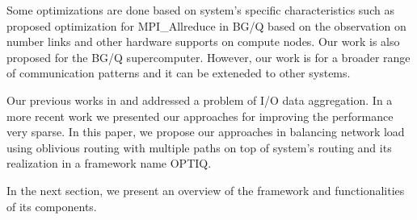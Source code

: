 
Some optimizations are done based on system’s specific characteristics such as \cite{Kumar:Allreduce} proposed optimization for MPI\_Allreduce in BG/Q based on the observation on number links and other hardware supports on compute nodes. Our work is also proposed for the BG/Q supercomputer. However, our work is for a broader range of communication patterns and it can be exteneded to other systems.

Our previous works in \cite{Vishwanath:GLEAN} and \cite{SDAV:Bui2014b} addressed a problem of I/O data aggregation. In a more recent work \cite{hbui:bgq} we presented our approaches for improving the performance very sparse. In this paper, we propose our approaches in balancing network load using oblivious routing with multiple paths on top of system's routing and its realization in a framework name OPTIQ. 

In the next section, we present an overview of the framework and functionalities of its components.
